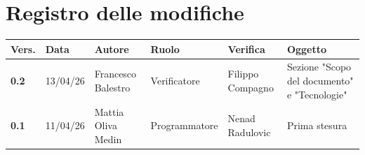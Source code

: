 \documentclass[a4paper,12pt]{article}
\begin{document}
    

    \section*{Registro delle modifiche} {
        \begin{table}[h!]
                \begin{tabularx}{\textwidth}{|l|l|l|l|L|L|}
                \hline
                \textbf{Vers.} & \textbf{Data} & \textbf{Autore} & \textbf{Ruolo} & \textbf{Verifica} & \textbf{Oggetto} \\
                \hline
                \textbf{0.2} & 13/04/26 & Francesco Balestro & Verificatore & Filippo Compagno & Sezione "Scopo del documento" e "Tecnologie" \\
                \hline
                \textbf{0.1} & 11/04/26 & Mattia Oliva Medin & Programmatore & Nenad Radulovic & Prima stesura \\
                \hline
            \end{tabularx}
        \end{table}
    }
    \newpage
    
    \tableofcontents
    \newpage

    \listoffigures
    \newpage
    
    \listoftables
    \newpage
\end{document}
